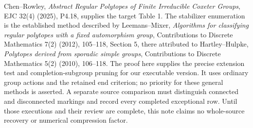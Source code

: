 \documentclass[11pt,a4paper]{article}
\begin{document}
Chen--Rowley, \emph{Abstract Regular Polytopes of Finite Irreducible Coxeter
Groups}, EJC 32(4) (2025), P4.18, supplies the target Table 1. The stabilizer
enumeration is the established method described by Leemans--Mixer,
\emph{Algorithms for classifying regular polytopes with a fixed automorphism
group}, Contributions to Discrete Mathematics 7(2) (2012), 105--118,
Section 5, there attributed to Hartley--Hulpke,
\emph{Polytopes derived from sporadic simple groups}, Contributions to
Discrete Mathematics 5(2) (2010), 106--118. The proof here supplies the
precise extension test and completion-subgroup pruning for our executable
version. It uses ordinary group actions and the retained end criterion;
no priority for these general methods is asserted. A separate
source comparison must distinguish connected and disconnected markings and
record every completed exceptional row. Until those executions and their
review are complete, this note claims no whole-source recovery or numerical
compression factor.
\end{document}
